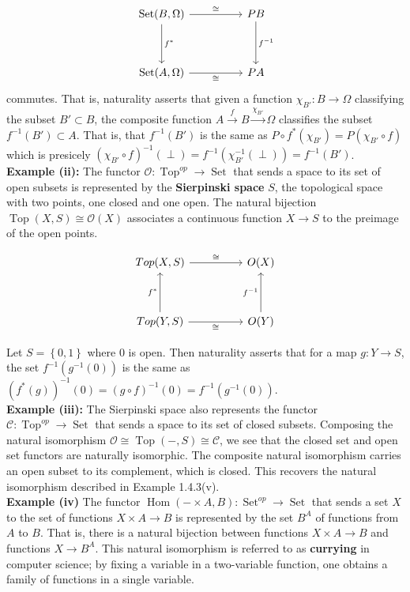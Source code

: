 \documentclass[a4paper]{article}
\DeclareMathOperator{\Hom}{Hom}
\DeclareMathOperator{\Set}{Set}
\DeclareMathOperator{\Top}{Top}
\begin{document}
\[\begin{tikzcd}
	{\text{Set}(B, \Omega)} && PB \\
	\\
	{\text{Set}(A, \Omega)} && PA
	\arrow["{f^*}", from=1-1, to=3-1]
	\arrow["{f^{-1}}", from=1-3, to=3-3]
	\arrow["\cong", from=1-1, to=1-3]
	\arrow["\cong"', from=3-1, to=3-3]
\end{tikzcd}\]
commutes. That is, naturality asserts that given a function
$\chi_{B'}  \colon B \to \Omega$ classifying the subset
$B' \subset B$, the composite function
$A \stackrel{f}{\to } B \stackrel{\chi_{B'}}{\to } \Omega$ classifies the
subset
$f^{-1}(B') \subset A$. That is, that
$f^{-1}(B')$ is the same as
$P\circ f^{*} (\chi_{B'}) = 
P \left( \chi_{B'}\circ f \right) 
$ which is presicely
$(\chi_{B'} \circ f)^{-1}(\perp) =
f^{-1} \left( \chi_{B'}^{-1}(\perp) \right) 
= f^{-1} \left( B' \right) $.\\
\linebreak
\textbf{Example (ii):} The functor
$\mathcal{O}  \colon \Top^{op} \to \Set$ that sends a space to its set of open
subsets is represented by the \textbf{Sierpinski space} $S$, the topological
space with two points, one closed and one open. The natural bijection
$\Top (X, S) \cong \mathcal{O}(X)$ associates a continuous function
$X \to S$ to the preimage of the open points.

\[\begin{tikzcd}
	{Top(X,S)} && {O(X)} \\
	\\
	{Top(Y,S)} && {O(Y)}
	\arrow["{f^{-1}}", from=3-3, to=1-3]
	\arrow["{f^*}", from=3-1, to=1-1]
	\arrow["\cong"', from=3-1, to=3-3]
	\arrow["\cong", from=1-1, to=1-3]
\end{tikzcd}\]

Let $S = \left\{ 0,1 \right\} $ where $0$ is open. Then
naturality asserts that
for a map $g  \colon Y \to S$, the set
$f^{-1}(g^{-1}(0))$ is the same as
$(f^{*} (g))^{-1}(0) =
(g \circ f)^{-1}(0)
= f^{-1} \left( g^{-1}(0) \right) $.\\
\linebreak
\textbf{Example (iii):} The Sierpinski space also represents the functor
$\mathcal{C}  \colon \Top^{op} \to \Set$ that sends a space to its set of
closed subsets. Composing the natural isomorphism
$\mathcal{O} \cong \Top (-,S) \cong \mathcal{C}$, we see that
the closed set and open set functors are naturally isomorphic. The
composite natural isomorphism carries an open subset to its complement, which
is closed. This recovers the natural isomorphism described in Example
1.4.3(v).\\
\linebreak
\textbf{Example (iv)} The functor
$\Hom (-\times A, B)  \colon \Set^{op} \to \Set$ that sends
a set $X$ to the set of functions
$X \times A \to B$ is represented by the set
$B^{A}$ of functions from $A$ to $B$. That is, there is a natural bijection
between functions $X \times A \to B$ and functions $X \to B^{A}$. This
natural isomorphism is referred to as
\textbf{currying} in computer science; by fixing a variable in a two-variable
function, one obtains a family of functions in a single variable.
\end{document}
